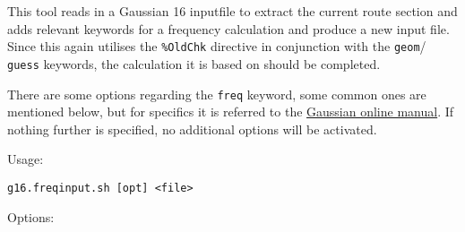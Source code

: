 \documentclass[   %
  final,          %
  a4paper         %
]{article}
\begin{document}
This tool reads in a Gaussian 16 inputfile to extract the current route section
and adds relevant keywords for a frequency calculation and produce a new input file.
Since this again utilises the \texttt{\%OldChk} directive in conjunction with 
the \texttt{geom}/ \texttt{guess} keywords, the calculation it is based on should be completed.

There are some options regarding the \texttt{freq} keyword, some common ones are mentioned below,
but for specifics it is referred to the \href{http://gaussian.com/freq/}{Gaussian online manual}.
If nothing further is specified, no additional options will be activated.

Usage: 

\lstinline`g16.freqinput.sh [opt] <file>`

Options:
\end{document}
